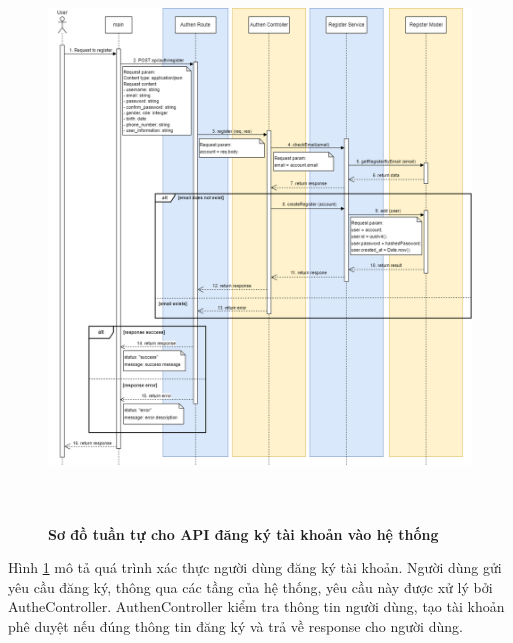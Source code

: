 \begin{figure}[H]
  \centering
  \includegraphics[width=16cm,height=15cm]{Images/sequence_api/register.png}
  \caption[Sơ đồ tuần tự cho API đăng ký tài khoản vào hệ thống]{\bfseries \fontsize{12pt}{0pt}
  \selectfont Sơ đồ tuần tự cho API đăng ký tài khoản vào hệ thống }
  \label{register} %
\end{figure}
Hình \ref{register}  mô tả quá trình xác thực người dùng đăng ký tài khoản. Người dùng gửi yêu cầu đăng ký, thông qua các tầng của hệ thống, yêu cầu này được xử lý bởi AutheController. AuthenController kiểm tra thông tin người dùng, tạo tài khoản phê duyệt 
nếu đúng thông tin đăng ký và trả về response cho người dùng.

